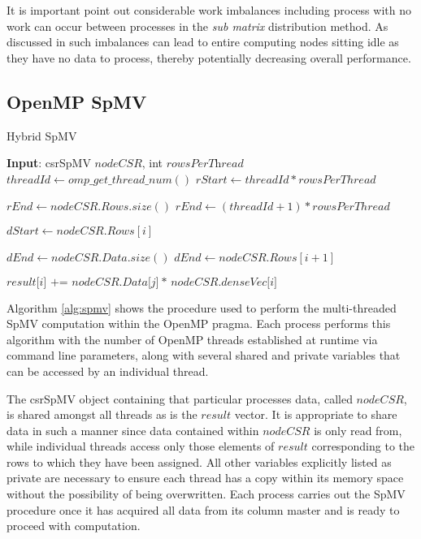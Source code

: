 It is important point out considerable work imbalances including process with no work can occur between processes in the \emph{sub matrix} distribution method. As discussed in \cite{techbib:6933066} such imbalances can lead to entire computing nodes sitting idle as they have no data to process, thereby potentially decreasing overall performance. 

\subsection{OpenMP SpMV}

\begin{algorithm}
\caption{Hybrid SpMV}\label{alg:spmv}
\begin{algorithmic}[1]
	\State \textbf{Input}: csrSpMV $\textit{nodeCSR}$, int $\textit{rowsPerThread}$
	\medskip
	\State $threadId \gets omp\_get\_thread\_num()$
	\State $rStart \gets threadId*rowsPerThread$
	\medskip
	
		\State $rEnd \gets nodeCSR.Rows.size()$
	\Else 
		\State $rEnd \gets (threadId+1) * rowsPerThread$
	\EndIf
	\medskip
	
		\State $dStart \gets nodeCSR.Rows[i]$
		
			\State $dEnd \gets nodeCSR.Data.size()$
		\Else 
			\State $dEnd \gets nodeCSR.Rows[i+1]$
		\EndIf
			
			\State $\textit{result[i] += nodeCSR.Data[j]$\
				$* nodeCSR.denseVec[i]}$
		\EndFor
	\EndFor
	
	\EndProcedure
\end{algorithmic}
\end{algorithm}

Algorithm \ref{alg:spmv} shows the procedure used to perform the multi-threaded SpMV computation within the OpenMP pragma. Each process performs this algorithm with the number of OpenMP threads established at runtime via command line parameters, along with several shared and private variables that can be accessed by an individual thread. 


The csrSpMV object containing that particular processes data, called $nodeCSR$, is shared amongst all threads as is the $result$ vector.
It is appropriate to share data in such a manner since data contained within $nodeCSR$ is only read from, while individual threads access only those elements of $result$ corresponding to the rows to which they have been assigned.
All other variables explicitly listed as private are necessary to ensure each thread has a copy within its memory space without the possibility of being overwritten.
Each process carries out the SpMV procedure once it has acquired all data from its column master and is ready to proceed with computation. 

